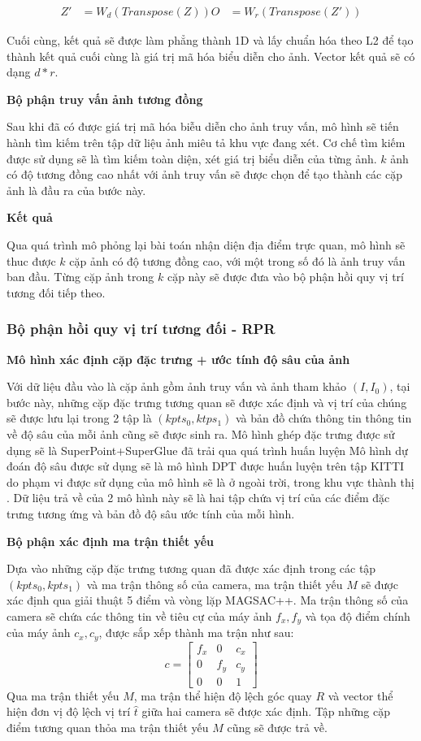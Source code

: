 $$
\begin{aligned}
Z' &= W_d(Transpose(Z))
O &= W_r(Transpose(Z'))
\end{aligned}
$$

Cuối cùng, kết quả sẽ được làm phẳng thành 1D và lấy chuẩn hóa theo L2 để tạo thành kết quả cuối cùng là giá trị mã hóa biểu diễn cho ảnh. Vector kết quả sẽ có dạng $d*r$.

\textbf{Bộ phận truy vấn ảnh tương đồng}

Sau khi đã có được giá trị mã hóa biễu diễn cho ảnh truy vấn, mô hình sẽ tiến hành tìm kiếm trên tập dữ liệu ảnh miêu tả khu vực đang xét. Cơ chế tìm kiếm được sử dụng sẽ là tìm kiếm toàn diện, xét giá trị biểu diễn của từng ảnh. $k$ ảnh có độ tương đồng cao nhất với ảnh truy vấn sẽ được chọn để tạo thành các cặp ảnh là đầu ra của bước này.

\textbf{Kết quả}

Qua quá trình mô phỏng lại bài toán nhận diện địa điểm trực quan, mô hình sẽ thuc được $k$ cặp ảnh có độ tương đồng cao, với một trong số đó là ảnh truy vấn ban đầu. Từng cặp ảnh trong $k$ cặp này sẽ được đưa vào bộ phận hồi quy vị trí tương đối tiếp theo.

\subsubsection*{Bộ phận hồi quy vị trí tương đối - RPR}
\textbf{Mô hình xác định cặp đặc trưng + ước tính độ sâu của ảnh}

Với dữ liệu đầu vào là cặp ảnh gồm ảnh truy vấn và ảnh tham khảo $(I,I_0)$, tại bước này, những cặp đặc trưng tương quan sẽ được xác định và vị trí của chúng sẽ được lưu lại trong 2 tập là $(kpts_0,ktps_1)$ và bản đồ chứa thông tin thông tin về độ sâu của mỗi ảnh cũng sẽ được sinh ra. Mô hình ghép đặc trưng được sử dụng sẽ là SuperPoint+SuperGlue \cite{sarlin2020superglue} đã trải qua quá trình huấn luyện Mô hình dự đoán độ sâu được sử dụng sẽ là mô hình DPT \cite{ranftl2021vision} được huấn luyện trên tập KITTI do phạm vi được sử dụng của mô hình sẽ là ở ngoài trời, trong khu vực thành thị \cite{arnold2022mapfree}. Dữ liệu trả về của 2 mô hình này sẽ là hai tập chứa vị trí của các điểm đặc trưng tương ứng và bản đồ độ sâu ước tính của mỗi hình.

\textbf{Bộ phận xác định ma trận thiết yếu}

Dựa vào những cặp đặc trưng tương quan đã được xác định trong các tập $(kpts_0, kpts_1)$ và ma trận thông số của camera, ma trận thiết yếu $M$ sẽ được xác định qua giải thuật 5 điểm và vòng lặp MAGSAC++. Ma trận thông số của camera sẽ chứa các thông tin về tiêu cự của máy ảnh $f_x,f_y$ và tọa độ điểm chính của máy ảnh $c_x,c_y$, được sắp xếp thành ma trận như sau:
$$
c = \begin{bmatrix} f_x & 0 & c_x \\ 0 & f_y & c_y \\ 0 & 0 & 1 \end{bmatrix}
$$ 
Qua ma trận thiết yếu $M$, ma trận thể hiện độ lệch góc quay $R$ và vector thể hiện đơn vị độ lệch vị trí $\hat{t}$ giữa hai camera sẽ được xác định. Tập những cặp điểm tương quan thỏa ma trận thiết yếu $M$ cũng sẽ được trả về.

